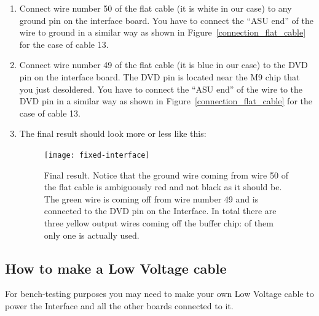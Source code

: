 \begin{enumerate}
\item Connect wire number 50 of the flat cable (it is white in our
  case) to any ground pin on the interface board. You have to connect
  the ``ASU end'' of the wire to ground in a similar way as shown in
  Figure~\ref{connection_flat_cable} for the case of cable 13.
\item Connect wire number 49 of the flat cable (it is blue in our
  case) to the DVD pin on the interface board. The DVD pin is located
  near the M9 chip that you just desoldered. You have to connect the
  ``ASU end'' of the wire to the DVD pin in a similar way as shown in
  Figure~\ref{connection_flat_cable} for the case of cable 13.
\item The final result should look more or less like this:
  \begin{figure}[H]
    \centering \texttt{[image: fixed-interface]}
    \caption{Final result. Notice that the ground wire coming from
      wire 50 of the flat cable is ambiguously red and not black as it
      should be. The green wire is coming off from wire number 49 and
      is connected to the DVD pin on the Interface. In total there are
      three yellow output wires coming off the buffer chip: of them
      only one is actually used.}\label{fixed-interface}
  \end{figure}
\end{enumerate}

\subsection{How to make a Low Voltage cable}
For bench-testing purposes you may need to make your own Low Voltage
cable to power the Interface and all the other boards connected to it.


